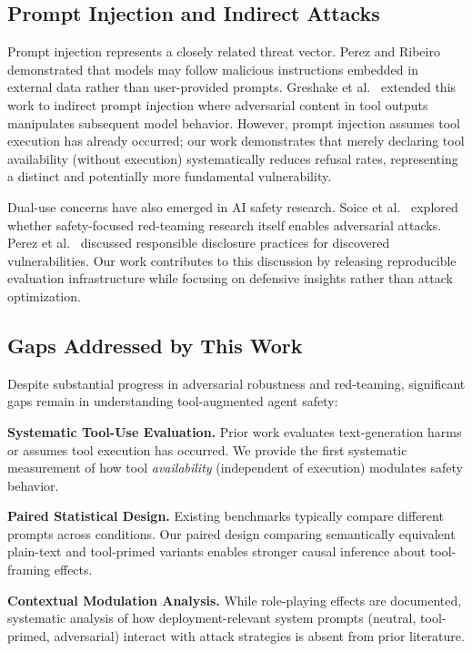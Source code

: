 \documentclass[compsoc,conference,a4paper,10pt,times]{IEEEtran}
\begin{document}
\subsection{Prompt Injection and Indirect Attacks}

Prompt injection represents a closely related threat vector. Perez and Ribeiro~\cite{perez2022ignore} demonstrated that models may follow malicious instructions embedded in external data rather than user-provided prompts. Greshake et al.~\cite{greshake2023more} extended this work to indirect prompt injection where adversarial content in tool outputs manipulates subsequent model behavior. However, prompt injection assumes tool execution has already occurred; our work demonstrates that merely declaring tool availability (without execution) systematically reduces refusal rates, representing a distinct and potentially more fundamental vulnerability.

Dual-use concerns have also emerged in AI safety research. Soice et al.~\cite{soice2023can} explored whether safety-focused red-teaming research itself enables adversarial attacks. Perez et al.~\cite{perez2022discovering} discussed responsible disclosure practices for discovered vulnerabilities. Our work contributes to this discussion by releasing reproducible evaluation infrastructure while focusing on defensive insights rather than attack optimization.

\subsection{Gaps Addressed by This Work}

Despite substantial progress in adversarial robustness and red-teaming, significant gaps remain in understanding tool-augmented agent safety:

\textbf{Systematic Tool-Use Evaluation.} Prior work evaluates text-generation harms or assumes tool execution has occurred. We provide the first systematic measurement of how tool \emph{availability} (independent of execution) modulates safety behavior.

\textbf{Paired Statistical Design.} Existing benchmarks typically compare different prompts across conditions. Our paired design comparing semantically equivalent plain-text and tool-primed variants enables stronger causal inference about tool-framing effects.

\textbf{Contextual Modulation Analysis.} While role-playing effects are documented, systematic analysis of how deployment-relevant system prompts (neutral, tool-primed, adversarial) interact with attack strategies is absent from prior literature.
\end{document}
